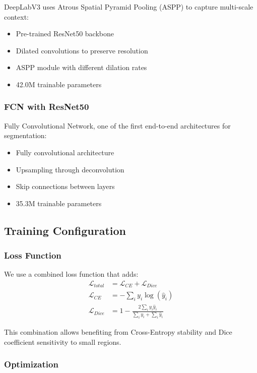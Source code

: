 \documentclass[12pt,a4paper]{article}
\begin{document}
DeepLabV3 uses Atrous Spatial Pyramid Pooling (ASPP) to capture multi-scale context:
\begin{itemize}
    \item Pre-trained ResNet50 backbone
    \item Dilated convolutions to preserve resolution
    \item ASPP module with different dilation rates
    \item 42.0M trainable parameters
\end{itemize}

\subsubsection{FCN with ResNet50}

Fully Convolutional Network, one of the first end-to-end architectures for segmentation:
\begin{itemize}
    \item Fully convolutional architecture
    \item Upsampling through deconvolution
    \item Skip connections between layers
    \item 35.3M trainable parameters
\end{itemize}

\subsection{Training Configuration}

\subsubsection{Loss Function}

We use a combined loss function that adds:
\begin{align}
\mathcal{L}_{total} &= \mathcal{L}_{CE} + \mathcal{L}_{Dice} \\
\mathcal{L}_{CE} &= -\sum_{i} y_i \log(\hat{y}_i) \\
\mathcal{L}_{Dice} &= 1 - \frac{2\sum_{i} y_i \hat{y}_i}{\sum_{i} y_i + \sum_{i} \hat{y}_i}
\end{align}

This combination allows benefiting from Cross-Entropy stability and Dice coefficient sensitivity to small regions.

\subsubsection{Optimization}
\end{document}
